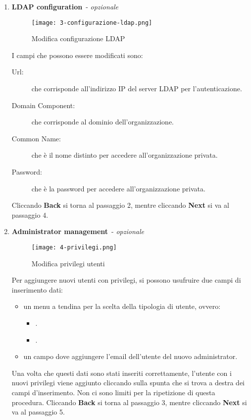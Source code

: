 \documentclass[../manuale-utente.tex]{subfiles}
\begin{document}
\begin{enumerate}
    \item \textbf{LDAP configuration}~- \textit{opzionale}

    \begin{figure}[H]
        \centering
        \texttt{[image: 3-configurazione-ldap.png]}
        \caption{Modifica configurazione LDAP}%
        \label{fig:web_app_modifica_configurazione_ldap}
    \end{figure}
    I campi che possono essere modificati sono:
    \begin{description}
      \item[Url:] che corrisponde all'indirizzo IP del server LDAP per l'autenticazione.
      \item[Domain Component:]  che corrisponde al dominio dell'organizzazione.
      \item[Common Name:] che è il nome distinto per accedere all'organizzazione privata.
      \item[Password:] che è la password per accedere all'organizzazione privata.
  \end{description}
    Cliccando \textbf{Back} si torna al passaggio 2, mentre cliccando \textbf{Next} si va al passaggio 4.

    \item \textbf{Administrator management}~- \textit{opzionale}

    \begin{figure}[H]
        \centering
        \texttt{[image: 4-privilegi.png]}
        \caption{Modifica privilegi utenti}%
        \label{fig:web_app_modifica_privilegi_utenti}
    \end{figure}
    Per aggiungere nuovi utenti con privilegi, si possono usufruire due campi di inserimento dati:
    \begin{itemize}
        \item un menu a tendina per la scelta della tipologia di utente, ovvero:
        \begin{itemize}
            \item {}.
            \item {}.
        \end{itemize}
        \item un campo dove aggiungere l'email dell'utente del nuovo administrator.
    \end{itemize}
    Una volta che questi dati sono stati inseriti correttamente, l'utente con i nuovi privilegi viene aggiunto cliccando sulla spunta che si trova a destra dei campi d'inserimento.
    Non ci sono limiti per la ripetizione di questa procedura.
    Cliccando \textbf{Back} si torna al passaggio 3, mentre cliccando \textbf{Next} si va al passaggio 5.


\end{enumerate}
\end{document}
